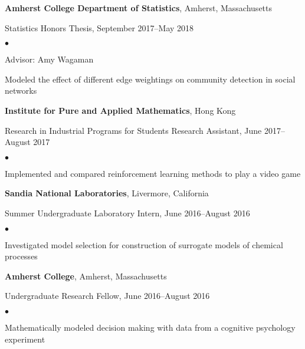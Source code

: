 \documentclass[margin,centered]{res}
\newenvironment{list1}{
  \begin{list}{\ding{113}}{%
      \setlength{\itemsep}{0in}
      \setlength{\parsep}{0in} \setlength{\parskip}{0in}
      \setlength{\topsep}{0in} \setlength{\partopsep}{0in}
      \setlength{\leftmargin}{0.17in}}}{\end{list}}
\newenvironment{list2}{
  \begin{list}{$\bullet$}{%
      \setlength{\itemsep}{0in}
      \setlength{\parsep}{0in} \setlength{\parskip}{0in}
      \setlength{\topsep}{0in} \setlength{\partopsep}{0in}
      \setlength{\leftmargin}{0.2in}}}{\end{list}}
\begin{document}
\begin{resume}
{\bf Amherst College Department of Statistics}, Amherst, Massachusetts
\begin{list1}
\item[] 
Statistics Honors Thesis, September 2017--May 2018
\begin{list2}
\vspace*{.05in}
\item
Advisor: Amy Wagaman
\item Modeled the effect of different edge weightings on community detection in social networks
\end{list2} 
\end{list1}


{\bf Institute for Pure and Applied Mathematics}, Hong Kong
\begin{list1}
\item[] 
Research in Industrial Programs for Students Research Assistant, June 2017--August 2017
\begin{list2}
\vspace*{.05in}
\item
Implemented and compared reinforcement learning methods to play a video game
\end{list2} 
\end{list1}

{\bf Sandia National Laboratories}, Livermore, California
\begin{list1}
\item[] 
Summer Undergraduate Laboratory Intern, June 2016--August 2016
\begin{list2}
\vspace*{.05in}
\item
Investigated model selection for construction of surrogate models of chemical processes
\end{list2} 
\end{list1}

{\bf Amherst College}, Amherst, Massachusetts 
\begin{list1}
\item[] 
Undergraduate Research Fellow, June 2016--August 2016
\begin{list2}
\vspace*{.05in}
\item
Mathematically modeled decision making with data from a cognitive psychology experiment
\end{list2} 
\end{list1}



\end{resume}
\end{document}
